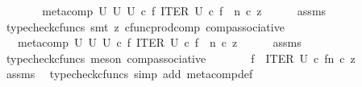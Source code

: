 \begin{isabellebody}
\ \ \isamarkupfalse%
\ \isamarkupfalse%
\ {\isachardoublequoteopen}{\isachardot}{\kern0pt}{\isachardot}{\kern0pt}{\isachardot}{\kern0pt}\ {\isacharequal}{\kern0pt}\ meta{\isacharunderscore}{\kern0pt}comp\ U\ U\ U\ {\isasymcirc}\isactrlsub c\ {\isasymlangle}f{\isacharcomma}{\kern0pt}\ ITER\ U\ {\isasymcirc}\isactrlsub c\ {\isasymlangle}f\ {\isacharcomma}{\kern0pt}\ n{\isasymrangle}{\isasymrangle}\ {\isasymcirc}\isactrlsub c\ z{\isachardoublequoteclose}\isanewline
\ \ \ \ \isamarkupfalse%
\ assms\ \isamarkupfalse%
\ {\isacharparenleft}{\kern0pt}typecheck{\isacharunderscore}{\kern0pt}cfuncs{\isacharcomma}{\kern0pt}\ smt\ {\isacharparenleft}{\kern0pt}z{}{\isacharparenright}{\kern0pt}\ cfunc{\isacharunderscore}{\kern0pt}prod{\isacharunderscore}{\kern0pt}comp\ comp{\isacharunderscore}{\kern0pt}associative{}{\isacharparenright}{\kern0pt}\isanewline
\ \ \isamarkupfalse%
\ \isamarkupfalse%
\ {\isachardoublequoteopen}{\isachardot}{\kern0pt}{\isachardot}{\kern0pt}{\isachardot}{\kern0pt}\ {\isacharequal}{\kern0pt}\ {\isacharparenleft}{\kern0pt}meta{\isacharunderscore}{\kern0pt}comp\ U\ U\ U\ {\isasymcirc}\isactrlsub c\ {\isasymlangle}f{\isacharcomma}{\kern0pt}\ ITER\ U\ {\isasymcirc}\isactrlsub c\ {\isasymlangle}f\ {\isacharcomma}{\kern0pt}\ n{\isasymrangle}{\isasymrangle}{\isacharparenright}{\kern0pt}\ {\isasymcirc}\isactrlsub c\ z{\isachardoublequoteclose}\isanewline
\ \ \ \ \isamarkupfalse%
\ assms\ \isamarkupfalse%
\ {\isacharparenleft}{\kern0pt}typecheck{\isacharunderscore}{\kern0pt}cfuncs{\isacharcomma}{\kern0pt}\ meson\ comp{\isacharunderscore}{\kern0pt}associative{}{\isacharparenright}{\kern0pt}\isanewline
\ \ \isamarkupfalse%
\ \isamarkupfalse%
\ {\isachardoublequoteopen}{\isachardot}{\kern0pt}{\isachardot}{\kern0pt}{\isachardot}{\kern0pt}\ {\isacharequal}{\kern0pt}\ {\isacharparenleft}{\kern0pt}f\ {\isasymbox}\ {\isacharparenleft}{\kern0pt}ITER\ U\ {\isasymcirc}\isactrlsub c\ {\isasymlangle}f{\isacharcomma}{\kern0pt}n{\isasymrangle}{\isacharparenright}{\kern0pt}{\isacharparenright}{\kern0pt}\ {\isasymcirc}\isactrlsub c\ z{\isachardoublequoteclose}\isanewline
\ \ \ \ \isamarkupfalse%
\ assms\ \isamarkupfalse%
\ {\isacharparenleft}{\kern0pt}typecheck{\isacharunderscore}{\kern0pt}cfuncs{\isacharcomma}{\kern0pt}\ simp\ add{\isacharcolon}{\kern0pt}\ meta{\isacharunderscore}{\kern0pt}comp{}{\isacharunderscore}{\kern0pt}def{}{\isacharparenright}{\kern0pt}\isanewline

\end{isabellebody}
